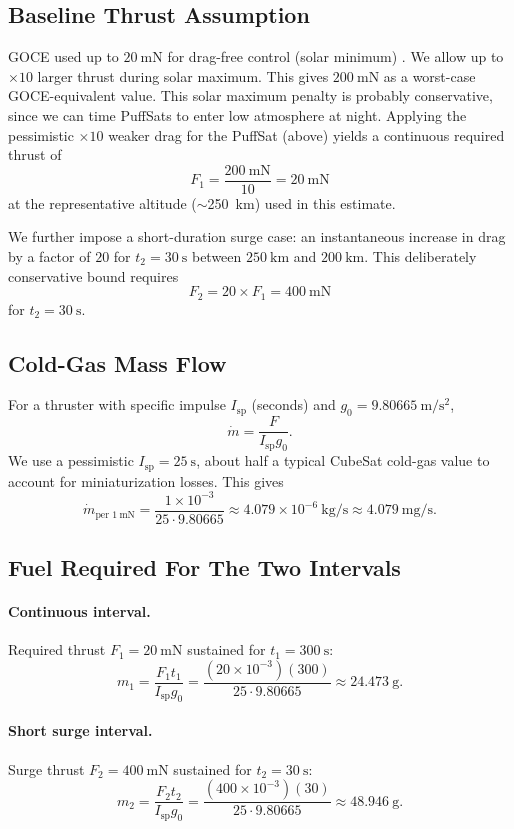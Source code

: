 \documentclass{article}
\begin{document}
\subsection*{Baseline Thrust Assumption}
GOCE used up to \(\SI{20}{\milli\newton}\) for drag-free control (solar minimum) \cite{goce_dragfree}. We allow up to \(\times 10\) larger thrust during solar maximum. This gives \(\SI{200}{\milli\newton}\) as a worst-case GOCE-equivalent value. This solar maximum penalty is probably conservative, since we can time PuffSats to enter low atmosphere at night. Applying the pessimistic \(\times 10\) weaker drag for the PuffSat (above) yields a continuous required thrust of
\[
F_1 = \frac{\SI{200}{\milli\newton}}{10} = \SI{20}{\milli\newton}
\]
at the representative altitude (\(\sim\)\SI{250}{\kilo\metre}) used in this estimate. 

We further impose a short-duration surge case: an instantaneous increase in drag by a factor of \(20\) for \(t_2=\SI{30}{\s}\) between \(\SI{250}{\kilo\metre}\) and \(\SI{200}{\kilo\metre}\). This deliberately conservative bound requires
\[
F_2 = 20\times F_1 = \SI{400}{\milli\newton}
\]
for \(t_2=\SI{30}{\s}\).

\subsection*{Cold-Gas Mass Flow}
For a thruster with specific impulse \(I_{\mathrm{sp}}\) (seconds) and \(g_0=\SI{9.80665}{\m\per\s^2}\),
\[
\dot m = \frac{F}{I_{\mathrm{sp}} g_0}.
\]
We use a pessimistic \(I_{\mathrm{sp}}=\SI{25}{\s}\), about half a typical CubeSat cold-gas value \cite{tummala2017cubesat} to account for miniaturization losses. This gives
\[
\dot m_{\text{per }1\ \mathrm{mN}} = \frac{1\times 10^{-3}}{25\cdot 9.80665}
\approx 4.079\times 10^{-6}\ \mathrm{kg/s} \approx 4.079\ \mathrm{mg/s}.
\]

\subsection*{Fuel Required For The Two Intervals}
\paragraph{Continuous interval.}
Required thrust \(F_1=\SI{20}{\milli\newton}\) sustained for \(t_1=\SI{300}{\s}\):
\[
m_1 = \frac{F_1 t_1}{I_{\mathrm{sp}} g_0}
= \frac{(20\times 10^{-3})(300)}{25\cdot 9.80665}
\approx \SI{24.473}{\g}.
\]

\paragraph{Short surge interval.}
Surge thrust \(F_2=\SI{400}{\milli\newton}\) sustained for \(t_2=\SI{30}{\s}\):
\[
m_2 = \frac{F_2 t_2}{I_{\mathrm{sp}} g_0}
= \frac{(400\times 10^{-3})(30)}{25\cdot 9.80665}
\approx \SI{48.946}{\g}.
\]
\end{document}
